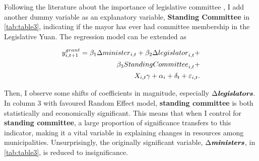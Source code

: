 Following the literature about the importance of legislative committee \citep[e.g.,][]{Martin2014,Wang2013,Hsiao2007, Matsuo2012}, I add another dummy variable as an explanatory variable, \textbf{Standing Committee} in \autoref{tab:table3}, indicating if the mayor has ever had committee membership in the Legislative Yuan. The regression model can be extended as


\begin{equation} \begin{split} \ensuremath{y_{i,t+1}^{grant}}= \ensuremath{\beta_{1}{\Delta minister}_{i,t} +\beta_{2}{\Delta legislator}_{i,t} + \\ \beta_{3}{Standing Committee}_{i,t} +\\ X_{i,t}\gamma + \alpha_{i} + \delta_{t} + \varepsilon_{i,t}}. \end{split} \end{equation} 

Then, I observe some shifts of coefficients in magnitude, especially $\Delta\textit{\textbf{legislators}}$. In column 3 with favoured Random Effect model, \textbf{standing committee} is both statistically and economically significant. This means that when I control for \textbf{standing committee}, a large proportion of significance transfers to this indicator, making it a vital variable in explaining changes in resources among municipalities. Unsurprisingly, the originally significant variable, $\Delta\textit{\textbf{ministers}}$, in \autoref{tab:table3}, is reduced to insignificance.

